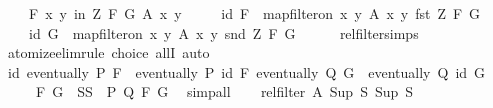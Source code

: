 \begin{isabellebody}
\ \ \ \ {\isacharparenleft}{\kern0pt}{\isasymforall}\isactrlsub F\ {\isacharparenleft}{\kern0pt}x{\isacharcomma}{\kern0pt}\ y{\isacharparenright}{\kern0pt}\ in\ Z\ F\ G{\isachardot}{\kern0pt}\ A\ x\ y{\isacharparenright}{\kern0pt}\ {\isasymand}\isanewline
\ \ \ \ id\ F\ {\isacharequal}{\kern0pt}\ map{\isacharunderscore}{\kern0pt}filter{\isacharunderscore}{\kern0pt}on\ {\isacharbraceleft}{\kern0pt}{\isacharparenleft}{\kern0pt}x{\isacharcomma}{\kern0pt}\ y{\isacharparenright}{\kern0pt}{\isachardot}{\kern0pt}\ A\ x\ y{\isacharbraceright}{\kern0pt}\ fst\ {\isacharparenleft}{\kern0pt}Z\ F\ G{\isacharparenright}{\kern0pt}\ {\isasymand}\isanewline
\ \ \ \ id\ G\ {\isacharequal}{\kern0pt}\ map{\isacharunderscore}{\kern0pt}filter{\isacharunderscore}{\kern0pt}on\ {\isacharbraceleft}{\kern0pt}{\isacharparenleft}{\kern0pt}x{\isacharcomma}{\kern0pt}\ y{\isacharparenright}{\kern0pt}{\isachardot}{\kern0pt}\ A\ x\ y{\isacharbraceright}{\kern0pt}\ snd\ {\isacharparenleft}{\kern0pt}Z\ F\ G{\isacharparenright}{\kern0pt}{\isachardoublequoteclose}\isanewline
\ \ \ \ \isamarkupfalse%
\ rel{\isacharunderscore}{\kern0pt}filter{\isachardot}{\kern0pt}simps\ \isamarkupfalse%
\ atomize{\isacharunderscore}{\kern0pt}elim{\isacharparenleft}{\kern0pt}{\isacharparenleft}{\kern0pt}rule\ choice\ allI{\isacharparenright}{\kern0pt}{\isacharplus}{\kern0pt}{\isacharsemicolon}{\kern0pt}\ auto{\isacharparenright}{\kern0pt}\isanewline
\ \ \isamarkupfalse%
\ id{\isacharcolon}{\kern0pt}\ {\isachardoublequoteopen}eventually\ P\ F\ {\isacharequal}{\kern0pt}\ eventually\ P\ {\isacharparenleft}{\kern0pt}id\ F{\isacharparenright}{\kern0pt}{\isachardoublequoteclose}\ {\isachardoublequoteopen}eventually\ Q\ G\ {\isacharequal}{\kern0pt}\ eventually\ Q\ {\isacharparenleft}{\kern0pt}id\ G{\isacharparenright}{\kern0pt}{\isachardoublequoteclose}\isanewline
\ \ \ \ \ {\isachardoublequoteopen}{\isacharparenleft}{\kern0pt}F{\isacharcomma}{\kern0pt}\ G{\isacharparenright}{\kern0pt}\ {\isasymin}\ SS{\isacharprime}{\kern0pt}{\isachardoublequoteclose}\ \ P\ Q\ F\ G\ \isamarkupfalse%
\ simp{\isacharunderscore}{\kern0pt}all\isanewline
\ \ \isamarkupfalse%
\ {\isachardoublequoteopen}rel{\isacharunderscore}{\kern0pt}filter\ A\ {\isacharparenleft}{\kern0pt}Sup\ S{\isacharparenright}{\kern0pt}\ {\isacharparenleft}{\kern0pt}Sup\ S{\isacharprime}{\kern0pt}{\isacharparenright}{\kern0pt}{\isachardoublequoteclose}\isanewline
\ \ \isamarkupfalse%
\isanewline
\ \ \ \ \isamarkupfalse%

\end{isabellebody}
